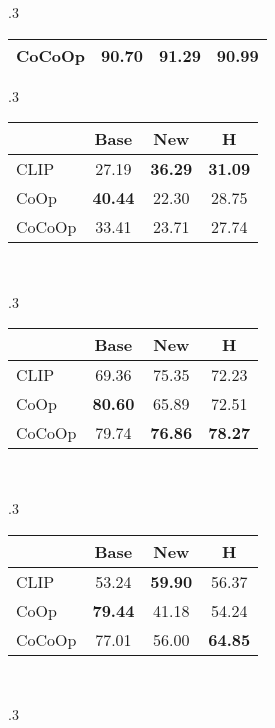 \documentclass[10pt,twocolumn,letterpaper]{article}
\begin{document}
\begin{table*}[t]
\begin{subtable}[t]{.3\textwidth}
\begin{tabular}{l cc|c}
    \rowcolor{tabhighlight}
    CoCoOp & \textbf{90.70} & \textbf{91.29} & \textbf{90.99} \\
    \bottomrule
    \end{tabular}
    \end{subtable}
    \vspace{1em}
    \begin{subtable}[t]{.3\textwidth}
    \centering
    \caption{FGVCAircraft.}
    \begin{tabular}{l cc|c}
    \toprule
    & Base & New & H \\
    \midrule
    CLIP & 27.19 & \textbf{36.29} & \textbf{31.09} \\
    CoOp & \textbf{40.44} & 22.30 & 28.75 \\
    \rowcolor{tabhighlight}
    CoCoOp & 33.41 & 23.71 & 27.74 \\
    \bottomrule
    \end{tabular}
    \end{subtable}
    ~
    \begin{subtable}[t]{.3\textwidth}
    \centering
    \caption{SUN397.}
    \begin{tabular}{l cc|c}
    \toprule
    & Base & New & H \\
    \midrule
    CLIP & 69.36 & 75.35 & 72.23 \\
    CoOp & \textbf{80.60} & 65.89 & 72.51 \\
    \rowcolor{tabhighlight}
    CoCoOp & 79.74 & \textbf{76.86} & \textbf{78.27} \\
    \bottomrule
    \end{tabular}
    \end{subtable}
    ~
    \begin{subtable}[t]{.3\textwidth}
    \centering
    \caption{DTD.}
    \begin{tabular}{l cc|c}
    \toprule
    & Base & New & H \\
    \midrule
    CLIP & 53.24 & \textbf{59.90} & 56.37 \\
    CoOp & \textbf{79.44} & 41.18 & 54.24 \\
    \rowcolor{tabhighlight}
    CoCoOp & 77.01 & 56.00 & \textbf{64.85} \\
    \bottomrule
    \end{tabular}
    \end{subtable}
    ~
    \begin{subtable}[t]{.3\textwidth}
    \centering
    \caption{EuroSAT.}
    \begin{tabular}{l cc|c}

\end{tabular}
\end{subtable}
\end{table*}
\end{document}
